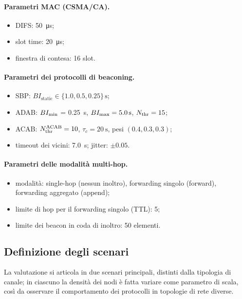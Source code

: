 \paragraph{Parametri MAC (CSMA/CA).}
\begin{itemize}[leftmargin=1.4em,nosep]
  \item DIFS: \SI{50}{\micro\second};
  \item slot time: \SI{20}{\micro\second};
  \item finestra di contesa: 16 slot.
\end{itemize}

\paragraph{Parametri dei protocolli di beaconing.}
\begin{itemize}[leftmargin=1.4em,nosep]
  \item SBP: $BI_{\text{static}} \in \{1.0, 0.5, 0.25\}\,\si{\second}$;
  \item ADAB: $BI_{\min}$ = \SI{0.25}{\second},
  $BI_{\max} = \SI{5.0}{\second}$, $N_{\mathrm{thr}} = 15$;
  \item ACAB: $N_{\mathrm{thr}}^{\mathrm{ACAB}} = 10$, $\tau_c = \SI{20}{\second}$,
  pesi $(0.4, 0.3, 0.3)$;
  \item timeout dei vicini: \SI{7.0}{\second}; jitter: $\pm 0.05$.
\end{itemize}

\paragraph{Parametri delle modalit\`a multi-hop.}
\begin{itemize}[leftmargin=1.4em,nosep]
  \item modalit\`a: single-hop (nessun inoltro), forwarding singolo
  (forward), forwarding aggregato (append);
  \item limite di hop per il forwarding singolo (TTL): 5;
  \item limite dei beacon in coda di inoltro: 50 elementi.
\end{itemize}

\subsection{Definizione degli scenari}
\label{sec:eval-scenarios}
La valutazione si articola in due scenari principali, distinti dalla tipologia
di canale; in ciascuno la densit\`a dei nodi \`e fatta variare come parametro
di scala, cos\`i da osservare il comportamento dei protocolli in topologie di rete diverse.

